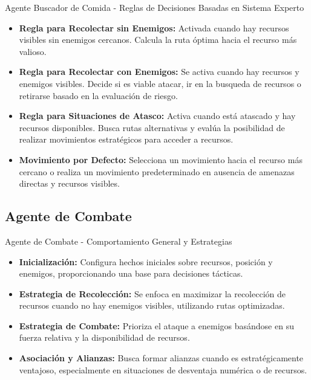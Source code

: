 \documentclass{beamer}
\begin{document}
\begin{frame}{Agente Buscador de Comida - Reglas de Decisiones Basadas en Sistema Experto}
  \begin{itemize}
    \item \textbf{Regla para Recolectar sin Enemigos:} Activada cuando hay recursos visibles sin enemigos cercanos. Calcula la ruta óptima hacia el recurso más valioso.
    \item \textbf{Regla para Recolectar con Enemigos:} Se activa cuando hay recursos y enemigos visibles. Decide si es viable atacar, ir en la busqueda de recursos o retirarse basado en la evaluación de riesgo.
    \item \textbf{Regla para Situaciones de Atasco:} Activa cuando está atascado y hay recursos disponibles. Busca rutas alternativas y evalúa la posibilidad de realizar movimientos estratégicos para acceder a recursos.
    \item \textbf{Movimiento por Defecto:} Selecciona un movimiento hacia el recurso más cercano o realiza un movimiento predeterminado en ausencia de amenazas directas y recursos visibles.
  \end{itemize}
\end{frame}

\subsection{Agente de Combate}
\begin{frame}{Agente de Combate - Comportamiento General y Estrategias}
  \begin{itemize}
    \item \textbf{Inicialización:} Configura hechos iniciales sobre recursos, posición y enemigos, proporcionando una base para decisiones tácticas.
    \item \textbf{Estrategia de Recolección:} Se enfoca en maximizar la recolección de recursos cuando no hay enemigos visibles, utilizando rutas optimizadas.
    \item \textbf{Estrategia de Combate:} Prioriza el ataque a enemigos basándose en su fuerza relativa y la disponibilidad de recursos.
    \item \textbf{Asociación y Alianzas:} Busca formar alianzas cuando es estratégicamente ventajoso, especialmente en situaciones de desventaja numérica o de recursos.
  \end{itemize}
\end{frame}
\end{document}
